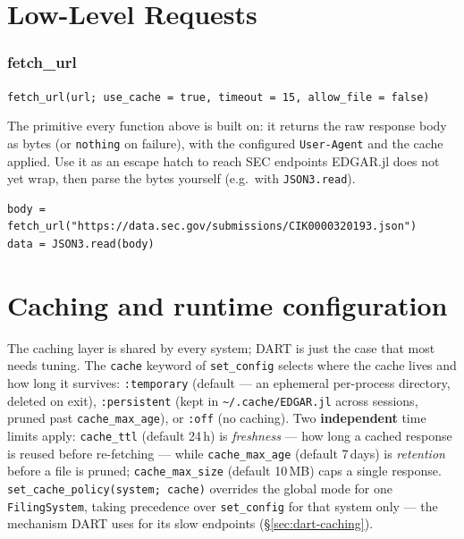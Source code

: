 \documentclass[11pt,a4paper]{report}
\newcommand{\sig}[1]{\medskip\noindent\texttt{#1}\par\medskip}
\begin{document}
\section{Low-Level Requests}
\label{sec:api-lowlevel}

\subsubsection{fetch\_url}

\sig{fetch\_url(url; use\_cache = true, timeout = 15, allow\_file = false)}

\noindent The primitive every function above is built on: it returns the raw
response body as bytes (or \texttt{nothing} on failure), with the configured
\texttt{User-Agent} and the cache applied. Use it as an escape hatch to reach SEC
endpoints EDGAR.jl does not yet wrap, then parse the bytes yourself (e.g.\ with
\texttt{JSON3.read}).

\begin{lstlisting}
body = fetch_url("https://data.sec.gov/submissions/CIK0000320193.json")
data = JSON3.read(body)
\end{lstlisting}



\section{Caching and runtime configuration}\label{sec:caching}

The caching layer is shared by every system; DART is just the
case that most needs tuning. The \texttt{cache} keyword of \texttt{set\_config} selects where the cache
lives and how long it survives: \texttt{:temporary} (default --- an ephemeral per-process directory,
deleted on exit), \texttt{:persistent} (kept in \texttt{\textasciitilde/.cache/EDGAR.jl} across sessions,
pruned past \texttt{cache\_max\_age}), or \texttt{:off} (no caching). Two \textbf{independent} time limits
apply: \texttt{cache\_ttl} (default 24\,h) is \emph{freshness} --- how long a cached response is reused
before re-fetching --- while \texttt{cache\_max\_age} (default 7\,days) is \emph{retention} before a file is
pruned; \texttt{cache\_max\_size} (default 10\,MB) caps a single response. \texttt{set\_cache\_policy(system;\
cache)} overrides the global mode for one \texttt{FilingSystem}, taking precedence over \texttt{set\_config}
for that system only --- the mechanism DART uses for its slow endpoints (\S\ref{sec:dart-caching}).
\end{document}
